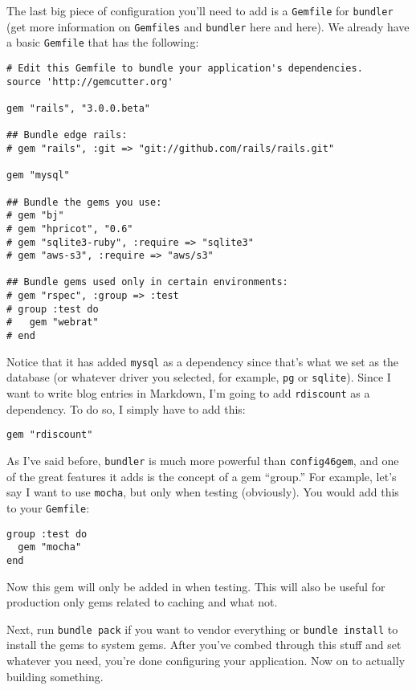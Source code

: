 \documentclass{book}
\begin{document}
The last big piece of configuration you'{}ll need to add is a {\colorbox[rgb]{0.87,0.87,0.87}{\tt Gemfile}} for {\colorbox[rgb]{0.87,0.87,0.87}{\tt bundler}} (get more information on {\colorbox[rgb]{0.87,0.87,0.87}{\tt Gemfiles}} and {\colorbox[rgb]{0.87,0.87,0.87}{\tt bundler}} here and here). We already have a basic {\colorbox[rgb]{0.87,0.87,0.87}{\tt Gemfile}} that has the following:

\begin{verbatim}# Edit this Gemfile to bundle your application's dependencies.
source 'http://gemcutter.org'

gem "rails", "3.0.0.beta"

## Bundle edge rails:
# gem "rails", :git => "git://github.com/rails/rails.git"

gem "mysql"

## Bundle the gems you use:
# gem "bj"
# gem "hpricot", "0.6"
# gem "sqlite3-ruby", :require => "sqlite3"
# gem "aws-s3", :require => "aws/s3"

## Bundle gems used only in certain environments:
# gem "rspec", :group => :test
# group :test do
#   gem "webrat"
# end\end{verbatim}
Notice that it has added {\colorbox[rgb]{0.87,0.87,0.87}{\tt mysql}} as a dependency since that'{}s what we set as the database (or whatever driver you selected, for example, {\colorbox[rgb]{0.87,0.87,0.87}{\tt pg}} or {\colorbox[rgb]{0.87,0.87,0.87}{\tt sqlite}}). Since I want to write blog entries in Markdown, I'{}m going to add {\colorbox[rgb]{0.87,0.87,0.87}{\tt rdiscount}} as a dependency. To do so, I simply have to add this:

\begin{verbatim}gem "rdiscount"\end{verbatim}
As I'{}ve said before, {\colorbox[rgb]{0.87,0.87,0.87}{\tt bundler}} is much more powerful than {\colorbox[rgb]{0.87,0.87,0.87}{\tt config\char46gem}}, and one of the great features it adds is the concept of a gem ``{}group.''{} For example, let'{}s say I want to use {\colorbox[rgb]{0.87,0.87,0.87}{\tt mocha}}, but only when testing (obviously). You would add this to your {\colorbox[rgb]{0.87,0.87,0.87}{\tt Gemfile}}:

\begin{verbatim}group :test do
  gem "mocha"
end\end{verbatim}
Now this gem will only be added in when testing. This will also be useful for production only gems related to caching and what not.

Next, run {\colorbox[rgb]{0.87,0.87,0.87}{\tt bundle~pack}} if you want to vendor everything or {\colorbox[rgb]{0.87,0.87,0.87}{\tt bundle~install}} to install the gems to system gems. After you'{}ve combed through this stuff and set whatever you need, you'{}re done configuring your application. Now on to actually building something.
\end{document}
